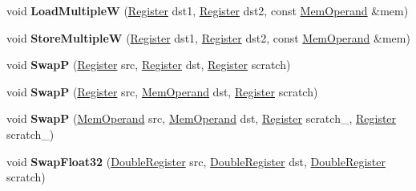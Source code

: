 \begin{DoxyCompactItemize}
void {\bfseries Load\+MultipleW} (\mbox{\hyperlink{classv8_1_1internal_1_1Register}{Register}} dst1, \mbox{\hyperlink{classv8_1_1internal_1_1Register}{Register}} dst2, const \mbox{\hyperlink{classv8_1_1internal_1_1MemOperand}{Mem\+Operand}} \&mem)
\item 
\mbox{\label{classv8_1_1internal_1_1TurboAssembler_a3fc99360d0b861e24565b8688b6385ae}} 
void {\bfseries Store\+MultipleW} (\mbox{\hyperlink{classv8_1_1internal_1_1Register}{Register}} dst1, \mbox{\hyperlink{classv8_1_1internal_1_1Register}{Register}} dst2, const \mbox{\hyperlink{classv8_1_1internal_1_1MemOperand}{Mem\+Operand}} \&mem)
\item 
\mbox{\label{classv8_1_1internal_1_1TurboAssembler_a8076613a4345a1cb21f1fd4e9c72b2b8}} 
void {\bfseries SwapP} (\mbox{\hyperlink{classv8_1_1internal_1_1Register}{Register}} src, \mbox{\hyperlink{classv8_1_1internal_1_1Register}{Register}} dst, \mbox{\hyperlink{classv8_1_1internal_1_1Register}{Register}} scratch)
\item 
\mbox{\label{classv8_1_1internal_1_1TurboAssembler_aaf891710bb12ef5942050f3aa0aba809}} 
void {\bfseries SwapP} (\mbox{\hyperlink{classv8_1_1internal_1_1Register}{Register}} src, \mbox{\hyperlink{classv8_1_1internal_1_1MemOperand}{Mem\+Operand}} dst, \mbox{\hyperlink{classv8_1_1internal_1_1Register}{Register}} scratch)
\item 
\mbox{\label{classv8_1_1internal_1_1TurboAssembler_a257c0ae0f89a471ac927cf67f9483bd0}} 
void {\bfseries SwapP} (\mbox{\hyperlink{classv8_1_1internal_1_1MemOperand}{Mem\+Operand}} src, \mbox{\hyperlink{classv8_1_1internal_1_1MemOperand}{Mem\+Operand}} dst, \mbox{\hyperlink{classv8_1_1internal_1_1Register}{Register}} scratch\+\_, \mbox{\hyperlink{classv8_1_1internal_1_1Register}{Register}} scratch\+\_)
\item 
\mbox{\label{classv8_1_1internal_1_1TurboAssembler_ac9202664a998d9858c2df04ab4cc2b2d}} 
void {\bfseries Swap\+Float32} (\mbox{\hyperlink{classv8_1_1internal_1_1DoubleRegister}{Double\+Register}} src, \mbox{\hyperlink{classv8_1_1internal_1_1DoubleRegister}{Double\+Register}} dst, \mbox{\hyperlink{classv8_1_1internal_1_1DoubleRegister}{Double\+Register}} scratch)

\end{DoxyCompactItemize}
